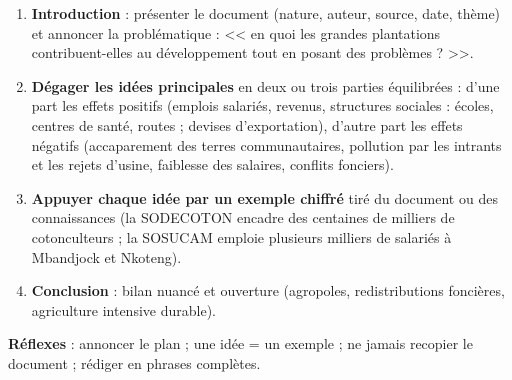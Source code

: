 \documentclass[11pt]{article}
\begin{document}
\begin{methode}
\begin{enumerate}
\item \textbf{Introduction} : présenter le document (nature, auteur, source, date, thème) et annoncer la problématique : << en quoi les grandes plantations contribuent-elles au développement tout en posant des problèmes ? >>.
\item \textbf{Dégager les idées principales} en deux ou trois parties équilibrées : d'une part les effets positifs (emplois salariés, revenus, structures sociales : écoles, centres de santé, routes ; devises d'exportation), d'autre part les effets négatifs (accaparement des terres communautaires, pollution par les intrants et les rejets d'usine, faiblesse des salaires, conflits fonciers).
\item \textbf{Appuyer chaque idée par un exemple chiffré} tiré du document ou des connaissances (la SODECOTON encadre des centaines de milliers de cotonculteurs ; la SOSUCAM emploie plusieurs milliers de salariés à Mbandjock et Nkoteng).
\item \textbf{Conclusion} : bilan nuancé et ouverture (agropoles, redistributions foncières, agriculture intensive durable).
\end{enumerate}
\textbf{Réflexes} : annoncer le plan ; une idée = un exemple ; ne jamais recopier le document ; rédiger en phrases complètes.
\end{methode}
\end{document}
